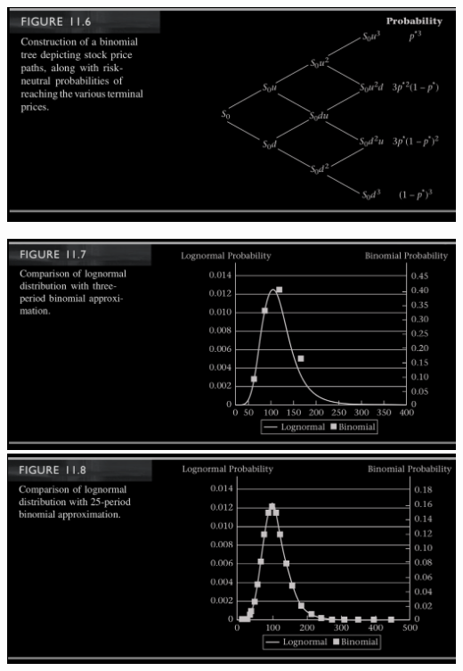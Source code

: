 \begin{frame}[fragile,t]
\begin{center}
	\includegraphics[scale=0.25]{figs/Figure-11-6.png}
\end{center}
\end{frame}
\begin{frame}[fragile,t]
\begin{center}
	\includegraphics[scale=0.2]{figs/Figure-11-7.png}
	\includegraphics[scale=0.2]{figs/Figure-11-8.png}
\end{center}
\end{frame}
